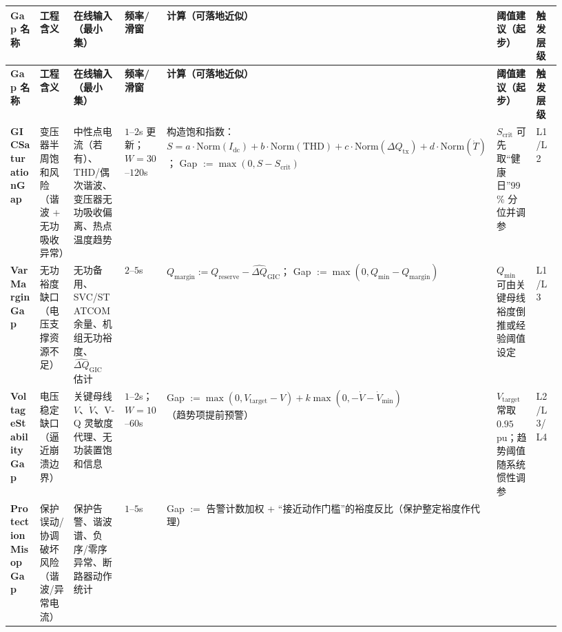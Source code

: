 \documentclass[12pt]{article}
\begin{document}
\begin{CJK*}{UTF8}{gkai}
\begingroup
\scriptsize
\setlength{\tabcolsep}{2pt}
\renewcommand{\arraystretch}{1.2}
\setlength{\LTleft}{0pt}
\setlength{\LTright}{0pt}
\begin{longtable}{|
  >{\raggedright\arraybackslash}p{0.11\linewidth}|
  >{\raggedright\arraybackslash}p{0.15\linewidth}|
  >{\raggedright\arraybackslash}p{0.17\linewidth}|
  >{\raggedright\arraybackslash}p{0.11\linewidth}|
  >{\raggedright\arraybackslash}p{0.20\linewidth}|
  >{\raggedright\arraybackslash}p{0.11\linewidth}|
  >{\raggedright\arraybackslash}p{0.08\linewidth}|}
\hline
\textbf{Gap 名称} & \textbf{工程含义} & \textbf{在线输入（最小集）} & \textbf{频率/滑窗} & \textbf{计算（可落地近似）} & \textbf{阈值建议（起步）} &
  \textbf{触发层级} \\
\hline
\endfirsthead
\hline
\textbf{Gap 名称} & \textbf{工程含义} & \textbf{在线输入（最小集）} & \textbf{频率/滑窗} & \textbf{计算（可落地近似）} & \textbf{阈值建议（起步）} &
  \textbf{触发层级} \\
\hline
\endhead
\textbf{GIC\allowbreak Saturation\allowbreak Gap}
& 变压器半周饱和风险（谐波 + 无功吸收异常）
& 中性点电流（若有）、THD/偶次谐波、变压器无功吸收偏离、热点温度趋势
& $1$--$2$s 更新；$W=30$--$120$s
& 构造饱和指数：$S=a\cdot \mathrm{Norm}(I_{\mathrm{dc}})+b\cdot\mathrm{Norm}(\mathrm{THD})+c\cdot\mathrm{Norm}(\Delta
  Q_{\mathrm{tx}})+d\cdot\mathrm{Norm}(\dot T)$；
\newline Gap $:=\max(0,S-S_{\mathrm{crit}})$
& $S_{\mathrm{crit}}$ 可先取“健康日”99\% 分位并调参
& L1/L2
\\ \hline
\textbf{Var\allowbreak Margin\allowbreak Gap}
& 无功裕度缺口（电压支撑资源不足）
& 无功备用、SVC/STATCOM 余量、机组无功裕度、$\widehat{\Delta Q}_{\mathrm{GIC}}$ 估计
& $2$--$5$s
& $Q_{\mathrm{margin}}:=Q_{\mathrm{reserve}}-\widehat{\Delta Q}_{\mathrm{GIC}}$；
\newline Gap $:=\max(0,Q_{\min}-Q_{\mathrm{margin}})$
& $Q_{\min}$ 可由关键母线裕度倒推或经验阈值设定
& L1/L3
\\ \hline
\textbf{Voltage\allowbreak Stability\allowbreak Gap}
& 电压稳定缺口（逼近崩溃边界）
& 关键母线 $V$、$\dot V$、V-Q 灵敏度代理、无功装置饱和信息
& $1$--$2$s；$W=10$--$60$s
& Gap $:=\max(0,V_{\mathrm{target}}-V)+k\max(0,-\dot V-\dot V_{\min})$（趋势项提前预警）
& $V_{\mathrm{target}}$ 常取 $0.95$ pu；趋势阈值随系统惯性调参
& L2/L3/L4
\\ \hline
\textbf{Protection\allowbreak Misop\allowbreak Gap}
& 保护误动/协调破坏风险（谐波/异常电流）
& 保护告警、谐波谱、负序/零序异常、断路器动作统计
& $1$--$5$s
& Gap $:=$ 告警计数加权 + “接近动作门槛”的裕度反比（保护整定裕度作代理）

\end{longtable}
\end{CJK*}
\end{document}

